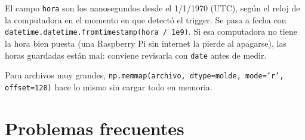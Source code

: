 \documentclass[11pt,a4paper]{article}
\newcommand{\code}[1]{\texttt{#1}}
\begin{document}
El campo \code{hora} son los nanosegundos desde el 1/1/1970 (UTC), según el reloj de
la computadora en el momento en que detectó el trigger. Se pasa a fecha con
\code{datetime.datetime.fromtimestamp(hora / 1e9)}. Si esa computadora no tiene la
hora bien puesta (una Raspberry Pi sin internet la pierde al apagarse), las horas
guardadas están mal: conviene revisarla con \code{date} antes de medir.

Para archivos muy grandes, \code{np.memmap(archivo, dtype=molde, mode='r',
offset=128)} hace lo mismo sin cargar todo en memoria.

\section{Problemas frecuentes}
\end{document}
